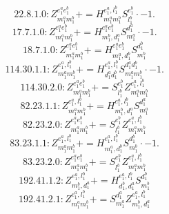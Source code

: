\documentclass[letterpaper,10pt,fleqn,leqno,onecolumn]{article}
\begin{document}
\begin{equation} \;\;\;\;\;\;  22.8.1.0: Z^{e_{1}^{a}e_{1}^{b}}_{m_{1}^{a}m_{1}^{b}}+=H^{e_{1}^{a},l_{1}^{b}}_{m_{1}^{a}m_{1}^{b}}S^{e_{1}^{b}}_{l_{1}^{b}}\cdot -1. \end{equation}
\begin{equation} \;\;\;\;\;\;  17.7.1.0: Z^{e_{1}^{a}e_{1}^{b}}_{m_{1}^{a}m_{1}^{b}}+=H^{e_{1}^{a}e_{1}^{b}}_{m_{1}^{b},d_{1}^{a}}S^{d_{1}^{a}}_{m_{1}^{a}}\cdot -1. \end{equation}
\begin{equation} \;\;\;\;\;\;  18.7.1.0: Z^{e_{1}^{a}e_{1}^{b}}_{m_{1}^{a}m_{1}^{b}}+=H^{e_{1}^{a}e_{1}^{b}}_{m_{1}^{a},d_{1}^{b}}S^{d_{1}^{b}}_{m_{1}^{b}} \end{equation}
\begin{equation} \;\;\;\;\;\;  114.30.1.1: Z^{e_{1}^{a},l_{1}^{b}}_{m_{1}^{a}m_{1}^{b}}+=H^{e_{1}^{a},l_{1}^{b}}_{d_{1}^{a}d_{1}^{b}}S^{d_{1}^{a}d_{1}^{b}}_{m_{1}^{a}m_{1}^{b}}\cdot -1. \end{equation}
\begin{equation} \;\;\;\;\;\;  114.30.2.0: Z^{e_{1}^{a}e_{1}^{b}}_{m_{1}^{a}m_{1}^{b}}+=S^{e_{1}^{b}}_{l_{1}^{b}}Z^{e_{1}^{a},l_{1}^{b}}_{m_{1}^{a}m_{1}^{b}} \end{equation}
\begin{equation} \;\;\;\;\;\;  82.23.1.1: Z^{e_{1}^{a},l_{1}^{b}}_{m_{1}^{a}m_{1}^{b}}+=H^{e_{1}^{a},l_{1}^{b}}_{m_{1}^{b},d_{1}^{a}}S^{d_{1}^{a}}_{m_{1}^{a}} \end{equation}
\begin{equation} \;\;\;\;\;\;  82.23.2.0: Z^{e_{1}^{a}e_{1}^{b}}_{m_{1}^{a}m_{1}^{b}}+=S^{e_{1}^{b}}_{l_{1}^{b}}Z^{e_{1}^{a},l_{1}^{b}}_{m_{1}^{a}m_{1}^{b}} \end{equation}
\begin{equation} \;\;\;\;\;\;  83.23.1.1: Z^{e_{1}^{a},l_{1}^{b}}_{m_{1}^{a}m_{1}^{b}}+=H^{e_{1}^{a},l_{1}^{b}}_{m_{1}^{a},d_{1}^{b}}S^{d_{1}^{b}}_{m_{1}^{b}}\cdot -1. \end{equation}
\begin{equation} \;\;\;\;\;\;  83.23.2.0: Z^{e_{1}^{a}e_{1}^{b}}_{m_{1}^{a}m_{1}^{b}}+=S^{e_{1}^{b}}_{l_{1}^{b}}Z^{e_{1}^{a},l_{1}^{b}}_{m_{1}^{a}m_{1}^{b}} \end{equation}
\begin{equation} \;\;\;\;\;\;  192.41.1.2: Z^{e_{1}^{a},l_{1}^{b}}_{m_{1}^{b},d_{1}^{a}}+=H^{e_{1}^{a},l_{1}^{b}}_{d_{1}^{b},d_{1}^{a}}S^{d_{1}^{b}}_{m_{1}^{b}} \end{equation}
\begin{equation} \;\;\;\;\;\;  192.41.2.1: Z^{e_{1}^{a},l_{1}^{b}}_{m_{1}^{a}m_{1}^{b}}+=S^{d_{1}^{a}}_{m_{1}^{a}}Z^{e_{1}^{a},l_{1}^{b}}_{m_{1}^{b},d_{1}^{a}} \end{equation}
\end{document}
